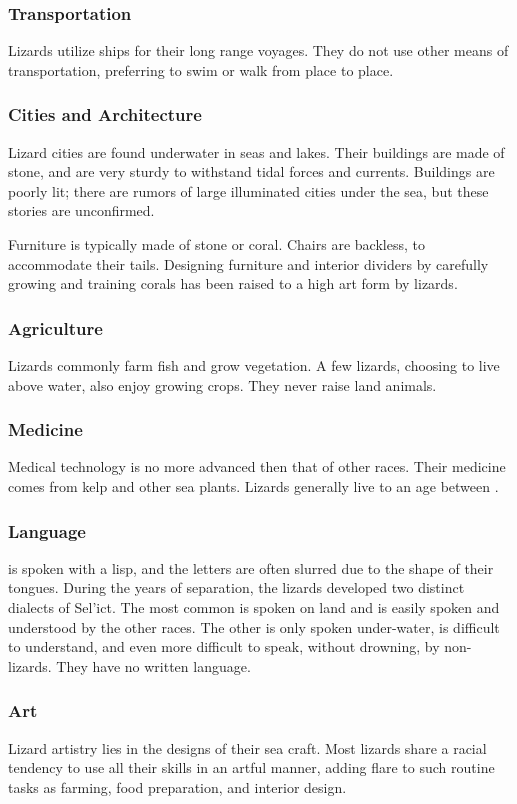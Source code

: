 \begin{multicols*}{2}
\subsubsection{Transportation}
Lizards utilize ships for their long range voyages. They do not use other means of transportation, preferring to swim or walk from place to place.
\subsubsection{Cities and Architecture}
Lizard cities are found underwater in seas and lakes. Their buildings are made of stone, and are very sturdy to withstand tidal forces and currents. Buildings are poorly lit; there are rumors of large illuminated cities under the sea, but these stories are unconfirmed.

Furniture is typically made of stone or coral. Chairs are backless, to accommodate their tails. Designing furniture and interior dividers by carefully growing and training corals has been raised to a high art form by lizards.
\subsubsection{Agriculture}
Lizards commonly farm fish and grow vegetation. A few lizards, choosing to live above water, also enjoy growing crops. They never raise land animals.
\subsubsection{Medicine}
Medical technology is no more advanced then that of other races. Their medicine comes from kelp and other sea plants. Lizards generally live to an age between .
\subsubsection{Language}
 is spoken with a lisp, and the letters are often slurred due to the shape of their tongues. During the years of separation, the lizards developed two distinct dialects of Sel'ict. The most common is spoken on land and is easily spoken and understood by the other races. The other is only spoken under-water, is difficult to understand, and even more difficult to speak, without drowning, by non-lizards. They have no written language.
\subsubsection{Art}
Lizard artistry lies in the designs of their sea craft. Most lizards share a racial tendency to use all their skills in an artful manner, adding flare to such routine tasks as farming, food preparation, and interior design.

\end{multicols*}
